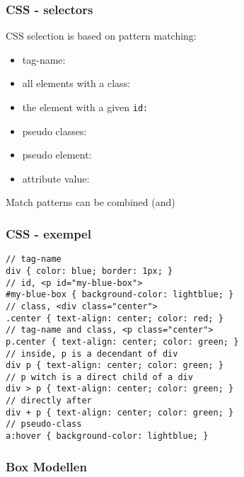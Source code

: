\begin{frame}[fragile]
\frametitle{CSS - selectors}
\color{structure}
CSS selection is based on pattern matching:\\
\begin{itemize}\color{structure}
\item tag-name: 
\item all elements with a class: 
\item the element with a given \tt{id}: 
\item pseudo classes: 
\item pseudo element:  
\item attribute value:  
\end{itemize}
Match patterns can be combined (and)
\end{frame}

\begin{frame}[fragile]
\frametitle{CSS - exempel}
\color{structure}
\begin{lstlisting}[style=htmlcssjs]
// tag-name
div { color: blue; border: 1px; }
// id, <p id="my-blue-box">
#my-blue-box { background-color: lightblue; }
// class, <div class="center">
.center { text-align: center; color: red; }
// tag-name and class, <p class="center">
p.center { text-align: center; color: green; }
// inside, p is a decendant of div
div p { text-align: center; color: green; }
// p witch is a direct child of a div
div > p { text-align: center; color: green; }
// directly after
div + p { text-align: center; color: green; }
// pseudo-class
a:hover { background-color: lightblue; }
\end{lstlisting}
\end{frame}

\begin{frame}[fragile]
\frametitle{Box Modellen}
\color{structure}

\end{frame}

